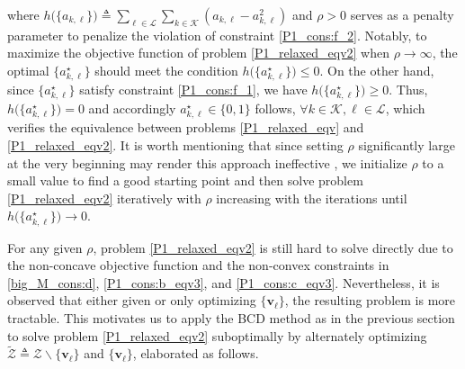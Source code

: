 \documentclass[12pt,draftclsnofoot, onecolumn]{IEEEtran}
\theoremstyle{plain}
\begin{document}
\begin{sloppypar}
where $h\big(\{a_{k,\ell}\}\big) \triangleq \sum_{\ell \in\mathcal L}\sum_{k \in\mathcal K} \left(a_{k,\ell} - a_{k,\ell}^2\right)$ and $\rho > 0$ serves as a penalty parameter to penalize the violation of constraint \eqref{P1_cons:f_2}. Notably, to maximize the objective function of problem \eqref{P1_relaxed_eqv2} when $\rho\rightarrow \infty$, the optimal $\{a_{k,\ell}^\star\}$ should meet the condition $h\big(\{a_{k,\ell}^\star\}\big)\leq 0$. On the other hand, since $\{a_{k,\ell}^\star\}$ satisfy constraint \eqref{P1_cons:f_1}, we have $h\big(\{a_{k,\ell}^\star\}\big) \geq 0$. Thus, $h\big(\{a_{k,\ell}^\star\}\big) = 0$ and accordingly $a_{k,\ell}^\star\in\{0,1\}$ follows, $\forall k\in\mathcal K, \ell\in\mathcal L$, which verifies the equivalence between problems \eqref{P1_relaxed_eqv} and \eqref{P1_relaxed_eqv2}. It is worth mentioning that since setting $\rho$ significantly large at the very beginning may render this approach ineffective \cite{2000_Runarsson_penalty}, we initialize $\rho$ to a small value to find a good starting point and then solve problem \eqref{P1_relaxed_eqv2} iteratively with $\rho$ increasing with the iterations until $h\big({\{a_{k,\ell}^\star\}}\big) \rightarrow 0$. 

For any given $\rho$, problem \eqref{P1_relaxed_eqv2} is still hard to solve directly due to the non-concave objective function and the non-convex constraints in  \eqref{big_M_cons:d}, \eqref{P1_cons:b_eqv3}, and \eqref{P1_cons:c_eqv3}. Nevertheless, it is observed that either given or only optimizing $\{\mathbf v_\ell\}$, the resulting problem is more tractable. This motivates us to apply the BCD method as in the previous section to solve problem \eqref{P1_relaxed_eqv2} suboptimally by alternately optimizing $\tilde{\mathcal Z} \triangleq \mathcal Z\backslash\{\mathbf v_\ell\}$ and $\{\mathbf v_{\ell}\}$, elaborated as follows. %


\end{sloppypar}
\end{document}
